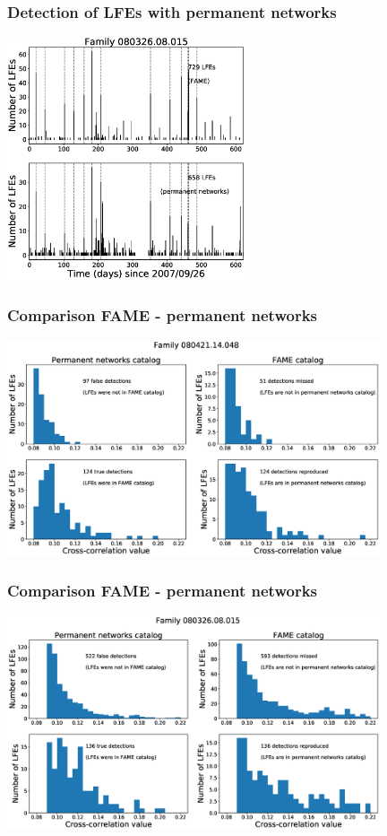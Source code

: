 \documentclass{beamer}
\begin{document}
	\begin{frame}
		\frametitle{Detection of LFEs with permanent networks}
		\begin{center}
			\includegraphics[width=7cm, trim={0cm 0cm 0cm 2cm}, clip]{catalog_SC/08032608015_permanent.eps}
		\end{center}
	\end{frame}

	\begin{frame}
		\frametitle{Comparison FAME - permanent networks}
		\begin{center}
			\includegraphics[width=11cm, trim={0cm 0cm 0cm 0cm}, clip]{catalog_SC/08042114048_comparison.eps}
		\end{center}
	\end{frame}

	\begin{frame}
		\frametitle{Comparison FAME - permanent networks}
		\begin{center}
			\includegraphics[width=11cm, trim={0cm 0cm 0cm 0cm}, clip]{catalog_SC/08032608015_comparison.eps}
		\end{center}
	\end{frame}
\end{document}

